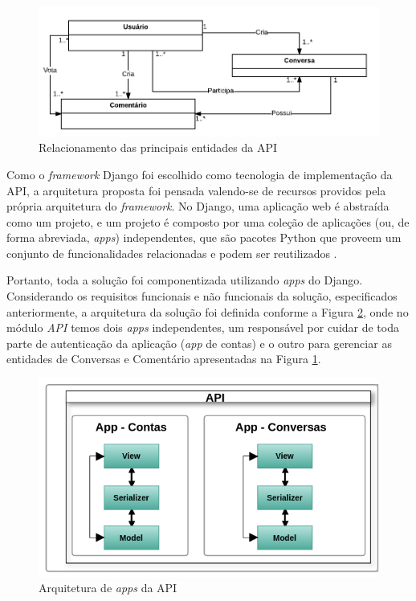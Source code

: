 	\begin{figure}[h!]
	\centering
	\includegraphics[scale=0.5]{figuras/entidades.png}
	\caption{Relacionamento das principais entidades da API}
	\label{fig:entidades}
	\end{figure}

	Como o \textit{framework} Django foi escolhido como tecnologia de implementação da API,
	a arquitetura proposta foi pensada valendo-se de 
	recursos providos pela própria arquitetura do \textit{framework}.
	No Django, uma aplicação web é abstraída como um projeto, e um projeto é composto por uma coleção de aplicações
	(ou, de forma abreviada, \textit{apps}) independentes, que
	são pacotes Python que proveem um conjunto de funcionalidades relacionadas e podem ser reutilizados \cite{django_apps}.

	Portanto, toda a solução foi componentizada utilizando \textit{apps} do 
	Django. Considerando os requisitos funcionais e não funcionais da solução, especificados anteriormente, a arquitetura da solução foi definida 
	conforme a Figura \ref{fig:arquitetura_api}, onde no módulo \textit{API} temos dois \textit{apps} independentes, um responsável
	por cuidar de toda parte de autenticação da aplicação (\textit{app} de contas) e o outro para gerenciar as entidades de Conversas 
	e Comentário apresentadas na Figura \ref{fig:entidades}. 

	\begin{figure}[h!]
	\centering
	\includegraphics[scale=0.8]{figuras/arquitetura_api.png}
	\caption{Arquitetura de \textit{apps} da API}
	\label{fig:arquitetura_api}
	\end{figure}

